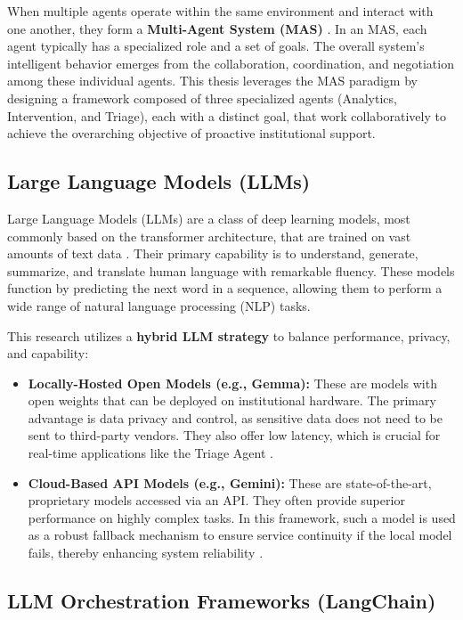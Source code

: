 When multiple agents operate within the same environment and interact with one another, they form a \textbf{Multi-Agent System (MAS)} \cite{FIND_CITATION_PLEASE}. In an MAS, each agent typically has a specialized role and a set of goals. The overall system's intelligent behavior emerges from the collaboration, coordination, and negotiation among these individual agents. This thesis leverages the MAS paradigm by designing a framework composed of three specialized agents (Analytics, Intervention, and Triage), each with a distinct goal, that work collaboratively to achieve the overarching objective of proactive institutional support.

\subsection{Large Language Models (LLMs)}
\label{subsec:llms}

Large Language Models (LLMs) are a class of deep learning models, most commonly based on the transformer architecture, that are trained on vast amounts of text data \cite{FIND_CITATION_PLEASE}. Their primary capability is to understand, generate, summarize, and translate human language with remarkable fluency. These models function by predicting the next word in a sequence, allowing them to perform a wide range of natural language processing (NLP) tasks.

This research utilizes a \textbf{hybrid LLM strategy} to balance performance, privacy, and capability:
\begin{itemize}
    \item \textbf{Locally-Hosted Open Models (e.g., Gemma):} These are models with open weights that can be deployed on institutional hardware. The primary advantage is data privacy and control, as sensitive data does not need to be sent to third-party vendors. They also offer low latency, which is crucial for real-time applications like the Triage Agent \cite{FIND_CITATION_PLEASE}.
    \item \textbf{Cloud-Based API Models (e.g., Gemini):} These are state-of-the-art, proprietary models accessed via an API. They often provide superior performance on highly complex tasks. In this framework, such a model is used as a robust fallback mechanism to ensure service continuity if the local model fails, thereby enhancing system reliability \cite{FIND_CITATION_PLEASE}.
\end{itemize}

\subsection{LLM Orchestration Frameworks (LangChain)}
\label{subsec:langchain}


